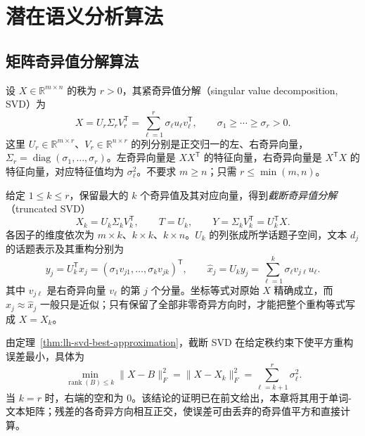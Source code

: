 \section{潜在语义分析算法}
\label{sec:lh-lsa-svd}

\subsection{矩阵奇异值分解算法}
\label{subsec:lh-lsa-truncated-svd}

设 $X\in\mathbb R^{m\times n}$ 的秩为 $r>0$，其紧奇异值分解（singular value decomposition, SVD）为
\begin{equation}
X=U_r\Sigma_rV_r^{\mathsf T}
=\sum_{\ell=1}^r\sigma_\ell u_\ell v_\ell^{\mathsf T},
\qquad \sigma_1\geq\cdots\geq\sigma_r>0.
\label{eq:lh-lsa-svd}
\end{equation}
这里 $U_r\in\mathbb R^{m\times r}$、$V_r\in\mathbb R^{n\times r}$ 的列分别是正交归一的左、右奇异向量，$\Sigma_r=\operatorname{diag}(\sigma_1,\ldots,\sigma_r)$。左奇异向量是 $XX^{\mathsf T}$ 的特征向量，右奇异向量是 $X^{\mathsf T}X$ 的特征向量，对应特征值均为 $\sigma_\ell^2$。不要求 $m\geq n$；只需 $r\leq\min(m,n)$。

给定 $1\leq k\leq r$，保留最大的 $k$ 个奇异值及其对应向量，得到\emph{截断奇异值分解}（truncated SVD）
\begin{equation}
X_k=U_k\Sigma_kV_k^{\mathsf T},\qquad
T=U_k,\qquad Y=\Sigma_kV_k^{\mathsf T}=U_k^{\mathsf T}X.
\label{eq:lh-lsa-svd-factors}
\end{equation}
各因子的维度依次为 $m\times k$、$k\times k$、$k\times n$。$U_k$ 的列张成所学话题子空间，文本 $d_j$ 的话题表示及其重构分别为
\begin{equation}
y_j=U_k^{\mathsf T}x_j
=(\sigma_1v_{j1},\ldots,\sigma_kv_{jk})^{\mathsf T},
\qquad
\widehat x_j=U_ky_j=\sum_{\ell=1}^k\sigma_\ell v_{j\ell}u_\ell.
\label{eq:lh-lsa-document-coordinates}
\end{equation}
其中 $v_{j\ell}$ 是右奇异向量 $v_\ell$ 的第 $j$ 个分量。坐标等式对原始 $X$ 精确成立，而 $x_j\approx\widehat x_j$ 一般只是近似；只有保留了全部非零奇异方向时，才能把整个重构等式写成 $X=X_k$。

由定理~\ref{thm:lh-svd-best-approximation}，截断 SVD 在给定秩约束下使平方重构误差最小，具体为
\begin{equation}
\min_{\operatorname{rank}(B)\leq k}\|X-B\|_F^2
=\|X-X_k\|_F^2=\sum_{\ell=k+1}^r\sigma_\ell^2.
\label{eq:lh-lsa-best-rank-k}
\end{equation}
当 $k=r$ 时，右端的空和为 $0$。该结论的证明已在前文给出，本章将其用于单词-文本矩阵；残差的各奇异方向相互正交，使误差可由丢弃的奇异值平方和直接计算。

